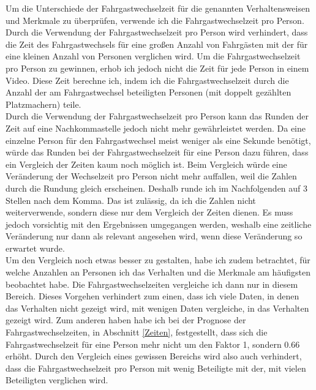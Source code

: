 Um die Unterschiede der Fahrgastwechselzeit für die genannten Verhaltensweisen und Merkmale zu überprüfen, verwende ich die Fahrgastwechselzeit pro Person. Durch die Verwendung der Fahrgastwechselzeit pro Person wird verhindert, dass die Zeit des Fahrgastwechsels für eine großen Anzahl von Fahrgästen mit der für eine kleinen Anzahl von Personen verglichen wird. Um die Fahrgastwechselzeit pro Person zu gewinnen, erhob ich jedoch nicht die Zeit für jede Person in einem Video. Diese Zeit berechne ich, indem ich die Fahrgastwechselzeit durch die Anzahl der am Fahrgastwechsel beteiligten Personen (mit doppelt gezählten Platzmachern) teile. \\
Durch die Verwendung der Fahrgastwechselzeit pro Person kann das Runden der Zeit auf eine Nachkommastelle jedoch nicht mehr gewährleistet werden. Da eine einzelne Person für den Fahrgastwechsel meist weniger als eine Sekunde benötigt, würde das Runden bei der Fahrgastwechselzeit für eine Person dazu führen, dass ein Vergleich der Zeiten kaum noch möglich ist. Beim Vergleich würde eine Veränderung der Wechselzeit pro Person nicht mehr auffallen, weil die Zahlen durch die Rundung gleich erscheinen. Deshalb runde ich im Nachfolgenden auf 3 Stellen nach dem Komma. Das ist zulässig, da ich die Zahlen nicht weiterverwende, sondern diese nur dem Vergleich der Zeiten dienen. Es muss jedoch vorsichtig mit den Ergebnissen umgegangen werden, weshalb eine zeitliche Veränderung nur dann als relevant angesehen wird, wenn diese Veränderung so erwartet wurde. \\
Um den Vergleich noch etwas besser zu gestalten, habe ich zudem betrachtet, für welche Anzahlen an Personen ich das Verhalten und die Merkmale am häufigsten beobachtet habe. Die Fahrgastwechselzeiten vergleiche ich dann nur in diesem Bereich. Dieses Vorgehen verhindert zum einen, dass ich viele Daten, in denen das Verhalten nicht gezeigt wird, mit wenigen Daten vergleiche, in das Verhalten gezeigt wird. Zum anderen haben habe ich bei der Prognose der Fahrgastwechselzeiten, in Abschnitt \ref{Zeiten}, festgestellt, dass sich die Fahrgastwechselzeit für eine Person mehr nicht um den Faktor 1, sondern 0.66 erhöht. Durch den Vergleich eines gewissen Bereichs wird also auch verhindert, dass die Fahrgastwechselzeit pro Person mit wenig Beteiligte mit der, mit vielen Beteiligten verglichen wird. 

